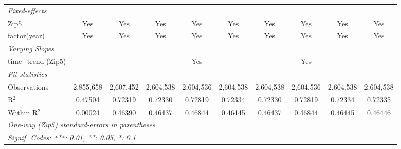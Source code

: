 \begin{table}[H]
{\begin{tabular}{lccccccccc}
 \midrule \emph{Fixed-effects}&   &   &   &   &   &   &   &   &  \\ 

 Zip5 & Yes & Yes & Yes & Yes & Yes & Yes & Yes & Yes & Yes\\ 

 factor(year) & Yes & Yes & Yes & Yes & Yes & Yes & Yes & Yes & Yes\\ 

 \midrule \emph{Varying Slopes}&   &   &   &   &   &   &   &   &  \\ 

 time\_trend (Zip5) &  &  &  & Yes &  &  & Yes &  & \\ 

 \midrule \emph{Fit statistics}&  & & & & & & & & \\ 

 Observations & 2,855,658&2,607,452&2,604,538&2,604,536&2,604,538&2,604,538&2,604,536&2,604,538&2,604,538\\ 

 R$^2$ & 0.47504&0.72319&0.72330&0.72819&0.72334&0.72330&0.72819&0.72334&0.72335\\ 

 Within R$^2$ & 0.00024&0.46390&0.46437&0.46844&0.46445&0.46437&0.46844&0.46445&0.46446\\ 

 \midrule\midrule\multicolumn{10}{l}{\emph{One-way (Zip5) standard-errors in parentheses}}\\ 

 \multicolumn{10}{l}{\emph{Signif. Codes: ***: 0.01, **: 0.05, *: 0.1}}\\ 

 \end{tabular}} 

 \end{table} 

  

